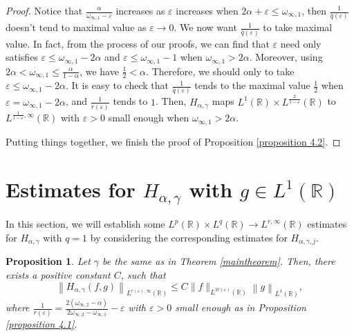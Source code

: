 \documentclass[11pt, twoside, leqno]{article}
\newtheorem{proposition}[theorem]{Proposition}
\theoremstyle{definition}
\numberwithin{equation}{section}
\begin{document}
\begin{proof}
Notice that $\frac{\alpha}{\omega_{\infty,1}-\varepsilon}$ increases as $\varepsilon$ increases when $2\alpha+\varepsilon\leq\omega_{\infty,1}$, then $\frac{1}{\bar{q}( \varepsilon )}$ doesn't tend to maximal value as $\varepsilon\rightarrow 0$. We now want $\frac{1}{\bar{q}( \varepsilon )}$ to take maximal value. In fact, from the process of our proofs, we can find that $\varepsilon$ need only satisfies $\varepsilon\leq\omega_{\infty,1}-2\alpha$ and $\varepsilon\leq\omega_{\infty,1}-1$ when $\omega_{\infty,1}>2\alpha$. Moreover, using $2\alpha<\omega_{\infty,1}\leq \frac{\alpha}{1-\alpha}$, we have $\frac{1}{2}<\alpha$. Therefore, we should only to take $\varepsilon\leq\omega_{\infty,1}-2\alpha$. It is easy to check that $\frac{1}{\bar{q}( \varepsilon )}$ tends to the maximal value $\frac{1}{2}$ when $\varepsilon=\omega_{\infty,1}-2\alpha$, and $\frac{1}{\bar{r}(\varepsilon )}$ tends to $1$. Then, $H_{\alpha,\gamma}$ maps $L^{1}(\mathbb{R})\times L^{\frac{2}{1-\varepsilon}}(\mathbb{R})$ to $L^{\frac{1}{1-\varepsilon}, \infty}(\mathbb{R})$ with $\varepsilon>0$ small enough when $\omega_{\infty,1}>2\alpha$.

Putting things together, we finish the proof of Proposition \ref{proposition 4.2}.
\end{proof}


\section{Estimates for $H_{\alpha,\gamma}$ with $g\in L^1(\mathbb{R})$}

In this section, we will establish some $L^p(\mathbb{R})\times L^q(\mathbb{R}) \rightarrow L^{r,\infty}(\mathbb{R})$ estimates for $H_{\alpha,\gamma}$ with $q=1$ by considering the corresponding estimates for $H_{\alpha,\gamma,j}$.

\begin{proposition}\label{proposition 5.1}
Let $\gamma $ be the same as in Theorem \ref{maintheorem}. Then, there exists a positive constant $C$, such that
$$\left\|H_{\alpha,\gamma}(f,g)\right\|_{L^{r(\varepsilon),\infty}(\mathbb{R})}\leq C \|f\|_{L^{2r(\varepsilon)}(\mathbb{R})}\left\|g\right\|_{L^{1}(\mathbb{R})},$$
where $\frac{1}{r( \varepsilon ) }=\frac{2(\omega_{\infty,2}-\alpha)}{2\omega_{\infty,2}-\omega_{\infty,1}}-\varepsilon $ with $\varepsilon>0$ small enough as in Proposition \ref{proposition 4.1}.
\end{proposition}
\end{document}

